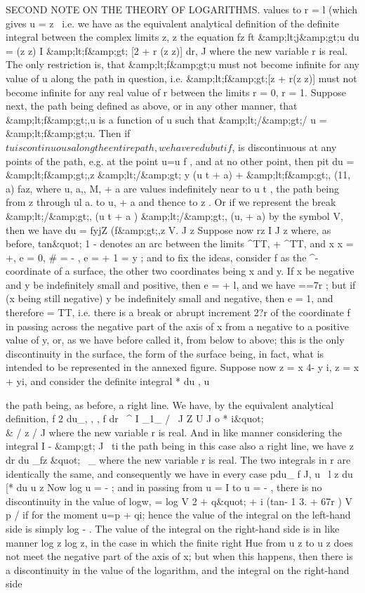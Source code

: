 \documentclass[11pt,a4paper]{book}
\begin{document}
{{SECOND
NOTE ON THE THEORY OF LOGARITHMS.
values
to
r = l
(which
gives
u = z \
i.e.
we have
as the
equivalent analytical
definition
of the
definite
integral between the complex
limits
z,
z
the equation
fz
ft
\&amp;lt;j\&amp;gt;u du = (z
z)
I
\&amp;lt;f\&amp;gt; [2 + r (z
z)] dr,
J
where
the
new
variable
r
is
real.
The
only
restriction
is,
that
\&amp;lt;f\&amp;gt;u must not become
infinite
for
any value
of u
along
the
path
in
question,
i.e.
\&amp;lt;f\&amp;gt;[z + r(z
z)]
must
not
become
infinite
for any
real value of r between the
limits
r = 0, r = 1.
Suppose
next, the path
being
defined
as
above, or
in
any other
manner,
that
\&amp;lt;f\&amp;gt;,u
is
a
function
of u
such
that
\&amp;lt;/\&amp;gt;/ u =
\&amp;lt;f\&amp;gt;u.
Then
if
$tu
is
continuous
along
the
entire
path, we have
re
du
but
if
$,
is
discontinuous
at
any
points
of
the
path,
e.g.
at
the
point u=u
f
, and
at no other point, then
pit du =
\&amp;lt;f\&amp;gt;,z
\&amp;lt;/\&amp;gt; y (u t + a) +
\&amp;lt;f\&amp;gt;, (11,
a)
faz,
where
u,
a,,
M, + a
are
values
indefinitely
near
to
u
t
,
the
path being
from
z through
ul
a.
to
u, + a
and
thence
to
z
.
Or
if we
represent
the break
\&amp;lt;/\&amp;gt;, (u t + a )
\&amp;lt;/\&amp;gt;, (u, + a)
by the symbol V, then we
have
du = fyjZ
(f\&amp;gt;,z
V.
J z
Suppose now
rz
I
J z
where, as
before,
tan\&quot;
1 - denotes an arc between the
limits
^TT, + ^TT, and
x
x = +,
e = 0,
\# = -
,
e = + 1 = y
;
and
to
fix
the
ideas,
consider
f
as
the
^-coordinate
of
a
surface,
the
other
two
coordinates
being
x
and
y.
If x
be
negative and
y be
indefinitely small and
positive,
then
e = + l,
and we
have
==7r
;
but
if
(x
being
still
negative)
y
be
indefinitely
small
and
negative, then
e =
1, and
therefore
=
TT,
i.e.
there
is
a
break
or abrupt
increment
2?r
of
the
coordinate
f
in
passing
across
the
negative
part
of
the
axis
of
x
from
a
negative
to
a
positive
value
of
y,
or,
as
we
have
before
called
it,
from
below
to
above;
this
is
the
only discontinuity
in
the
surface, the
form
of
the surface
being, in
fact, what
is intended
to be represented in the annexed
figure.
Suppose now
z = x
4- y i, z = x + yi, and
consider the
definite
integral
* du
,
u


the
path
being,
as
before,
a
right
line.
We
have,
by
the
equivalent
analytical
definition,
f
2 du_,
,
,
f
dr
\
^
I
_1_
/
\
J Z
U
J o *
i\&quot;
\\&
/
z
/
J
where
the new variable r
is
real.
And in
like manner considering the
integral
I
-
\&amp;gt;
J
\
ti
the path being in
this case
also a right
line, we have
z
dr
du _fz
\&quot;~
_
where
the new
variable
r
is
real.
The
two
integrals
in
r
are
identically
the
same,
and consequently we have in every case
pdu_ f
J,
u ~l z
du
[* du
u
z
Now
log u = -
;
and
in
passing
from
u = I
to
u = -
, there
is
no
discontinuity
in the
value
of logw,
= log V
2 +
q\&quot; + i (tan-
1 3. + 67r
)
V
p
/
if
for
the moment u=p + qi;
hence
the
value
of
the
integral
on
the
left-hand
side
is
simply log -
.
The
value
of the
integral
on the
right-hand
side
is
in
like
manner
log z
log z,
in
the
case
in
which
the
finite
right Hue
from
u
z
to u
z
does not
meet
the
negative
part
of
the
axis
of
x;
but when
this
happens,
then
there
is
a
discontinuity
in
the
value
of
the
logarithm,
and
the
integral
on
the
right-hand
side

}}
\end{document}
